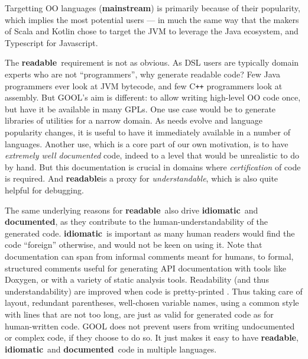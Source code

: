 \documentclass[sigplan,review,anonymous,prologue,dvipsnames]{acmart}
\newcommand{\Cplusplus}{C\texttt{++}}
\newcommand{\abbrev}[1]{\textbf{#1}}
\newcommand{\mainstream}{\abbrev{mainstream}}
\newcommand{\readable}{\abbrev{readable}}
\newcommand{\idiomatic}{\abbrev{idiomatic}}
\newcommand{\documented}{\abbrev{documented}}
\begin{document}
Targetting OO languages (\mainstream) is primarily because of their popularity,
which implies the most potential users --- in much the same way that the makers
of Scala and Kotlin chose to target the JVM to leverage the Java ecosystem, and
Typescript for Javascript.

The \readable~requirement is not as obvious. As DSL users are typically
domain experts who are not ``programmers'', why generate readable code?
Few Java programmers ever look at JVM bytecode, and few \Cplusplus{} programmers
look at assembly. But GOOL's aim is different: to allow writing
high-level OO code once, but have it be available in many GPLs. One use case
would be to generate libraries of utilities for a narrow domain. As needs
evolve and language popularity changes, it is useful to have it immediately
available in a number of languages. Another use, which is a core part of our
own motivation, is to have \emph{extremely well documented} code, indeed to
a level that would be unrealistic to do by hand. But this documentation is
crucial in domains where \emph{certification} of code is required.  And
\readable is a proxy for \emph{understandable}, which is also quite
helpful for debugging.

The same underlying reasons for \readable~also drive \idiomatic~and \documented,
as they contribute to the human-understandability of the generated code.
\idiomatic~is important as many human readers would find the code ``foreign''
otherwise, and would not be keen on using it.
Note that documentation can span from informal comments meant for humans, to
formal, structured comments useful for generating API documentation with tools
like Doxygen, or with a variety of static analysis tools.
Readability (and thus understandability) are improved when code is 
pretty-printed%
\cite{buse2009learning}. Thus taking care of layout, redundant parentheses,
well-chosen variable names, using a common style with lines that are not too
long, are just as valid for generated code as for human-written code.
GOOL does not prevent users from writing undocumented or complex code, if they
choose to do so. It just makes it easy to have \readable, \idiomatic~and
\documented~code in multiple languages.
\end{document}
